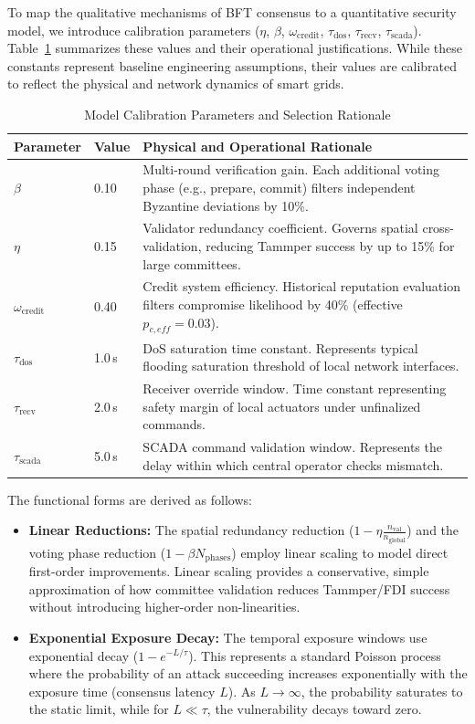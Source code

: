 \documentclass[10pt,twocolumn,journal]{IEEEtran}
\begin{document}
To map the qualitative mechanisms of BFT consensus to a quantitative security model, we introduce calibration parameters ($\eta$, $\beta$, $\omega_{\mathrm{credit}}$, $\tau_{\mathrm{dos}}$, $\tau_{\mathrm{recv}}$, $\tau_{\mathrm{scada}}$). Table~\ref{tab:parameter_selection} summarizes these values and their operational justifications. While these constants represent baseline engineering assumptions, their values are calibrated to reflect the physical and network dynamics of smart grids.

\begin{table}[t]
\caption{Model Calibration Parameters and Selection Rationale}
\label{tab:parameter_selection}
\centering
\scriptsize
\begin{tabular}{@{}llp{4.5cm}@{}}
\toprule
\textbf{Parameter} & \textbf{Value} & \textbf{Physical and Operational Rationale} \\
\midrule
$\beta$ & 0.10 & Multi-round verification gain. Each additional voting phase (e.g., prepare, commit) filters independent Byzantine deviations by 10\%. \\
$\eta$ & 0.15 & Validator redundancy coefficient. Governs spatial cross-validation, reducing Tammper success by up to 15\% for large committees. \\
$\omega_{\mathrm{credit}}$ & 0.40 & Credit system efficiency. Historical reputation evaluation filters compromise likelihood by 40\% (effective $p_{c,eff} = 0.03$). \\
$\tau_{\mathrm{dos}}$ & 1.0\,s & DoS saturation time constant. Represents typical flooding saturation threshold of local network interfaces. \\
$\tau_{\mathrm{recv}}$ & 2.0\,s & Receiver override window. Time constant representing safety margin of local actuators under unfinalized commands. \\
$\tau_{\mathrm{scada}}$ & 5.0\,s & SCADA command validation window. Represents the delay within which central operator checks mismatch. \\
\bottomrule
\end{tabular}
\end{table}

The functional forms are derived as follows:
\begin{itemize}[leftmargin=*]
    \item \textbf{Linear Reductions:} The spatial redundancy reduction ($1 - \eta \frac{n_{\mathrm{val}}}{n_{\mathrm{global}}}$) and the voting phase reduction ($1 - \beta N_{\mathrm{phases}}$) employ linear scaling to model direct first-order improvements. Linear scaling provides a conservative, simple approximation of how committee validation reduces Tammper/FDI success without introducing higher-order non-linearities.
    \item \textbf{Exponential Exposure Decay:} The temporal exposure windows use exponential decay ($1 - e^{-L/\tau}$). This represents a standard Poisson process where the probability of an attack succeeding increases exponentially with the exposure time (consensus latency $L$). As $L \to \infty$, the probability saturates to the static limit, while for $L \ll \tau$, the vulnerability decays toward zero.
\end{itemize}
\end{document}

